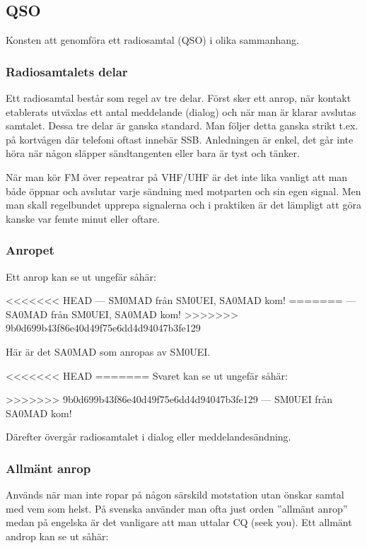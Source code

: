 \subsection{QSO}

Konsten att genomföra ett radiosamtal (QSO) i olika sammanhang.

\subsubsection{Radiosamtalets delar}

Ett radiosamtal består som regel av tre delar. Först sker ett anrop, när kontakt etablerats utväxlas ett antal meddelande (dialog) och när man är klarar avslutas samtalet. Dessa tre delar är ganska standard. Man följer detta ganska strikt t.ex. på kortvågen där telefoni oftast innebär SSB. Anledningen är enkel, det går inte höra när någon släpper sändtangenten eller bara är tyst och tänker.

När man kör FM över repeatrar på VHF/UHF är det inte lika vanligt att man både öppnar och avslutar varje sändning med motparten och sin egen signal. Men man skall regelbundet upprepa signalerna och i praktiken är det lämpligt att göra kanske var femte minut eller oftare.

\subsubsection{Anropet}

Ett anrop kan se ut ungefär såhär:

<<<<<<< HEAD
--- SM0MAD från SM0UEI, SA0MAD kom!
=======
--- SA0MAD från SM0UEI, SA0MAD kom!
>>>>>>> 9b0d699b43f86e40d49f75e6dd4d94047b3fe129

Här är det SA0MAD som anropas av SM0UEI. 

<<<<<<< HEAD
=======
Svaret kan se ut ungefär såhär:

>>>>>>> 9b0d699b43f86e40d49f75e6dd4d94047b3fe129
--- SM0UEI från SA0MAD kom!

Därefter övergår radiosamtalet i dialog eller meddelandesändning.

\subsubsection{Allmänt anrop} 

Används när man inte ropar på någon särskild motstation utan önskar samtal med vem som helst. På svenska använder man ofta just orden ''allmänt anrop'' medan på engelska är det vanligare att man uttalar CQ (seek you). Ett allmänt androp kan se ut såhär:

